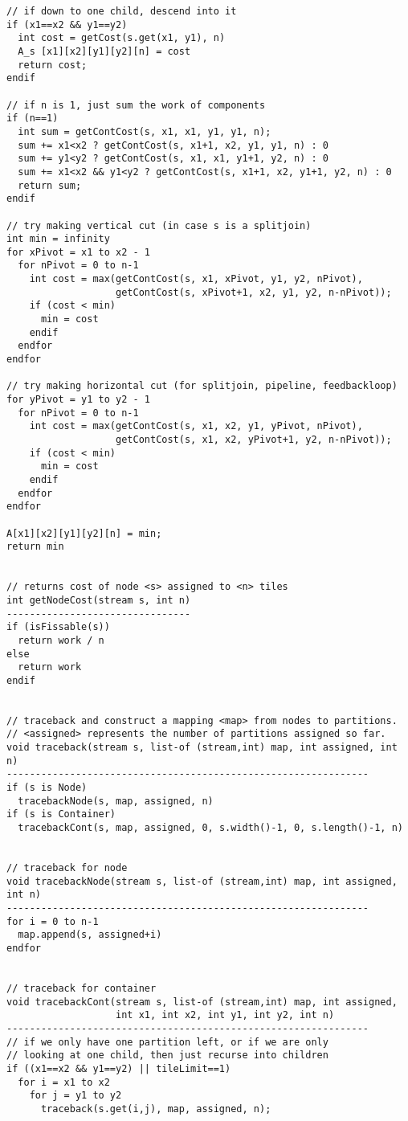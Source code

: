 \begin{verbatim}
// if down to one child, descend into it
if (x1==x2 && y1==y2)
  int cost = getCost(s.get(x1, y1), n)
  A_s [x1][x2][y1][y2][n] = cost
  return cost;
endif

// if n is 1, just sum the work of components
if (n==1)
  int sum = getContCost(s, x1, x1, y1, y1, n);
  sum += x1<x2 ? getContCost(s, x1+1, x2, y1, y1, n) : 0
  sum += y1<y2 ? getContCost(s, x1, x1, y1+1, y2, n) : 0
  sum += x1<x2 && y1<y2 ? getContCost(s, x1+1, x2, y1+1, y2, n) : 0
  return sum;
endif

// try making vertical cut (in case s is a splitjoin)
int min = infinity
for xPivot = x1 to x2 - 1
  for nPivot = 0 to n-1
    int cost = max(getContCost(s, x1, xPivot, y1, y2, nPivot),
                   getContCost(s, xPivot+1, x2, y1, y2, n-nPivot));
    if (cost < min)
      min = cost
    endif
  endfor
endfor

// try making horizontal cut (for splitjoin, pipeline, feedbackloop)
for yPivot = y1 to y2 - 1
  for nPivot = 0 to n-1
    int cost = max(getContCost(s, x1, x2, y1, yPivot, nPivot),
                   getContCost(s, x1, x2, yPivot+1, y2, n-nPivot));
    if (cost < min)
      min = cost
    endif
  endfor
endfor

A[x1][x2][y1][y2][n] = min;
return min


// returns cost of node <s> assigned to <n> tiles
int getNodeCost(stream s, int n)
--------------------------------
if (isFissable(s))
  return work / n
else
  return work
endif


// traceback and construct a mapping <map> from nodes to partitions.
// <assigned> represents the number of partitions assigned so far.
void traceback(stream s, list-of (stream,int) map, int assigned, int n)
---------------------------------------------------------------
if (s is Node)
  tracebackNode(s, map, assigned, n)
if (s is Container)
  tracebackCont(s, map, assigned, 0, s.width()-1, 0, s.length()-1, n)


// traceback for node
void tracebackNode(stream s, list-of (stream,int) map, int assigned, int n)
---------------------------------------------------------------
for i = 0 to n-1
  map.append(s, assigned+i)
endfor


// traceback for container
void tracebackCont(stream s, list-of (stream,int) map, int assigned, 
                   int x1, int x2, int y1, int y2, int n)
---------------------------------------------------------------
// if we only have one partition left, or if we are only
// looking at one child, then just recurse into children
if ((x1==x2 && y1==y2) || tileLimit==1)
  for i = x1 to x2
    for j = y1 to y2
      traceback(s.get(i,j), map, assigned, n);


\end{verbatim}

